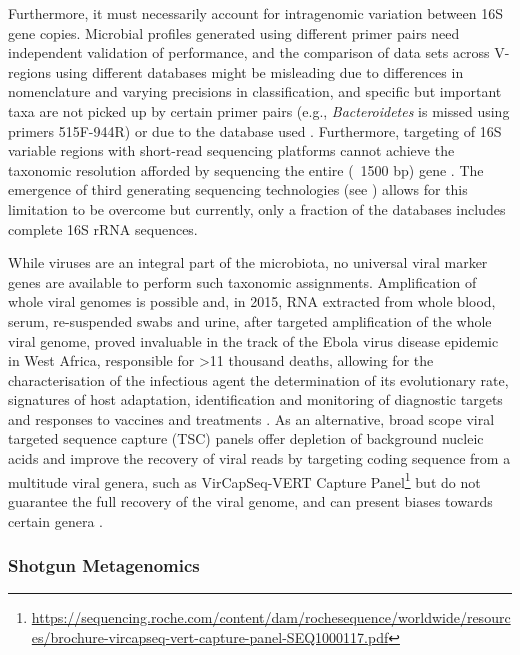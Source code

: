 Furthermore, it must necessarily account for intragenomic variation between 16S gene copies. 
Microbial profiles generated using different primer pairs need independent validation of performance, and the comparison of data sets across V-regions using different databases might be misleading due to differences in nomenclature and varying precisions in classification, and specific but important taxa are not picked up by certain primer pairs (e.g., \textit{Bacteroidetes} is missed using primers 515F-944R) or due to the database used \citep{abellan-schneyder_primer_2021}. 
Furthermore, targeting of 16S variable regions with short-read sequencing platforms cannot achieve the taxonomic resolution afforded by sequencing the entire (~1500 \ac{bp}) gene \citep{johnson_evaluation_2019}. 
The emergence of third generating sequencing technologies (see ) allows for this limitation to be overcome but currently, only a fraction of the databases includes complete 16S \ac{rRNA} sequences.

While viruses are an integral part of the microbiota, no universal viral marker genes are available to perform such taxonomic assignments. 
Amplification of whole viral genomes is possible and, in 2015, RNA extracted from whole blood, serum, re-suspended swabs and urine, after targeted amplification of the whole viral genome, proved invaluable in the track of the Ebola virus disease epidemic in West Africa, responsible for >11 thousand deaths, allowing for the characterisation of the infectious agent the determination of its evolutionary rate, signatures of host adaptation, identification and monitoring of diagnostic targets and responses to vaccines and treatments \citep{quick_real-time_2016}.
As an alternative, broad scope viral targeted sequence capture (TSC) panels offer depletion of background nucleic acids and improve the recovery of viral reads by targeting coding sequence from a multitude viral genera, such as VirCapSeq-VERT Capture Panel\footnote{\url{https://sequencing.roche.com/content/dam/rochesequence/worldwide/resources/brochure-vircapseq-vert-capture-panel-SEQ1000117.pdf}} but do not guarantee the full recovery of the viral genome, and can present biases towards certain genera \citep{schuele_assessment_2020, wylie_enhanced_2015}. 

\subsubsection{Shotgun Metagenomics} \label{sssec:_intro_shotgun_metagenomics}

